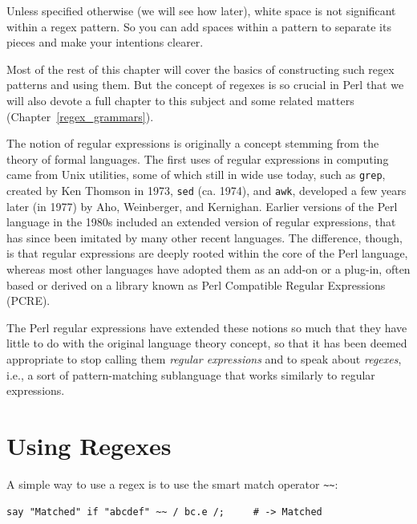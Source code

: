 Unless specified otherwise (we will see how later), white space 
is not significant within a regex pattern. So you can add spaces 
within a pattern to separate its pieces and make your 
intentions clearer.

Most of the rest of this chapter will cover the basics of constructing 
such regex patterns and using them. But the concept of 
regexes is so crucial in Perl that we will also devote a full 
chapter to this subject and some related matters (Chapter~\ref{regex_grammars}).

The notion of regular expressions is originally a concept 
stemming from the theory of formal languages. The first 
uses of regular expressions in computing came from 
Unix utilities, some of which still in wide use today, such as 
{\tt grep}, created by Ken Thomson in 1973, {\tt sed} (ca. 1974), and 
{\tt awk}, developed a few years later (in 1977) by Aho, Weinberger, and Kernighan. 
Earlier versions of the Perl language in the 1980s included an 
extended version of regular expressions, that has since 
been imitated by many other recent languages. The difference, 
though, is that regular expressions are deeply rooted within the 
core of the Perl language, whereas most other languages have 
adopted them as an add-on or a plug-in, often based or derived 
on a library known as Perl Compatible Regular Expressions (PCRE).

The Perl regular expressions have extended these notions 
so much that they have little to do with the original 
language theory concept, so that 
it has been deemed appropriate to stop calling them 
\emph{regular expressions} and to speak about \emph{regexes}, 
i.e., a sort of pattern-matching sublanguage that works 
similarly to regular expressions.

\section{Using Regexes}
\label{using_regexes}

A simple way to use a regex is to use the smart match operator 
\verb'~~':

\begin{verbatim}
say "Matched" if "abcdef" ~~ / bc.e /;     # -> Matched
\end{verbatim}
%

